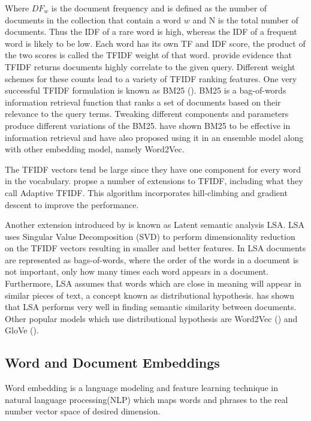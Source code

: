Where $DF_{w}$ is the document frequency and is defined as the number of documents in the collection that contain a word $w$ and N is the total number of documents. Thus the IDF of a rare word is high, whereas the IDF of a frequent word is likely to be low. Each word has its own TF and IDF score, the product of the two scores is called the TFIDF weight of that word. \cite{ramos2003using} provide evidence that TFIDF returns
documents highly correlate to the given query. Different weight schemes for these counts lead to a variety of TFIDF ranking features. One very successful TFIDF
formulation is known as BM25 (\cite{robertson2009probabilistic}).
BM25  is a bag-of-words information retrieval function that ranks a set of documents based on their relevance to the query terms. Tweaking different components and parameters produce different variations of the BM25. \cite{mitra2016dual} have shown BM25 to be effective in information retrieval and have also proposed using it in an ensemble model along with other embedding model, namely Word2Vec. 

The TFIDF vectors tend be large since they have one component for every word in the vocabulary. \cite{berger2000bridging} propse a number of extensions to TFIDF, including what they call Adaptive TFIDF. This algorithm incorporates hill-climbing and gradient descent to improve the performance.

Another extension introduced by \cite{dumais2004latent} is known as Latent semantic analysis LSA.
LSA uses Singular Value Decomposition (SVD) to perform dimensionality reduction on the TFIDF vectors resulting in smaller and better features. In LSA documents are represented as bags-of-words, where the order of the words in a document is not important, only how many times each word appears in a document. Furthermore, LSA assumes that words which are close in meaning will appear in similar pieces of text, a concept known as  distributional hypothesis. \cite{boling2014semantic} has shown that LSA performs very well in finding semantic similarity between documents. Other popular models which use distributional hypothesis are Word2Vec (\cite{mikolov2013efficient}) and GloVe (\cite{pennington2014glove}).
\subsection{Word and Document Embeddings} 
Word embedding is a language modeling and feature learning technique in natural language processing(NLP) which maps words and phrases to the real number vector space of desired dimension. 

